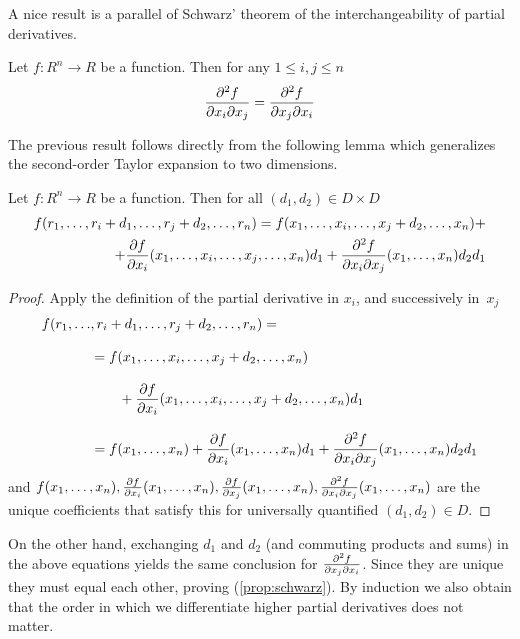 A nice result is a parallel of Schwarz' theorem of the interchangeability of partial derivatives.

\begin{proposition}
  Let \( f:R^n\to R \) be a function. Then for any \( 1\leq i,j\leq n \)
  \begin{equation*}
    \frac{\partial^{2} f}{\partial x_i \partial x_j}= \frac{\partial^{2} f}{\partial x_j \partial x_i}
  \end{equation*}
  \label{prop:schwarz}
\end{proposition}
The previous result follows directly from the following lemma which generalizes the second-order Taylor expansion to two dimensions.
\begin{lemma}
  Let \( f:R^n \to R \) be a function. Then for all \( (d_1,d_2)\in D\times D \)
  \begin{align*}
    f(r_1,\dots,r_i+d_1,\dots,r_j+d_2,\dots,r_n) = f(x_1,\dots,x_i,\dots,x_j+d_2,\dots,x_n) + \\
    \qquad + \frac{\partial f}{\partial x_i}(x_1,\dots,x_i,\dots,x_j,\dots,x_n)d_1 + \frac{\partial^{2} f}{\partial x_i \partial x_j}(x_1,\dots,x_n)d_2d_1 
  \end{align*}
\end{lemma}

\begin{proof}
  Apply the definition of the partial derivative in \( x_i \), and successively in~\( x_j \)
  \begin{align*}
    f(r_1,\dots&,r_i+d_1,\dots,r_j+d_2,\dots,r_n) =      \\[2ex]
      & = f(x_1,\dots,x_i,\dots,x_j+d_2,\dots,x_n) \\[2ex]
      & \quad\quad + \frac{\partial f}{\partial x_i}(x_1,\dots,x_i,\dots,x_j+d_2,\dots,x_n)d_1 \\[2ex]
      & = f(x_1,\dots,x_n) + \frac{\partial f}{\partial x_i}(x_1,\dots,x_n)d_1 + \frac{\partial^{2} f}{\partial x_i \partial x_j}(x_1,\dots,x_n)d_2d_1
  \end{align*}
  and \( f(x_1,\dots,x_n), \frac{\partial f}{\partial x_i}(x_1,\dots,x_n), \frac{\partial f}{\partial x_j}(x_1,\dots,x_n), \frac{\partial^{2} f}{\partial x_i \partial x_j}(x_1,\dots,x_n)  \) are the unique coefficients that satisfy this for universally quantified \( (d_1,d_2)\in D \).
\end{proof}

On the other hand, exchanging \( d_1 \) and \( d_2 \) (and commuting products and sums) in the above equations yields the same conclusion for \( \frac{\partial^{2} f}{\partial x_j \partial x_i} \). Since they are unique they must equal each other, proving (\ref{prop:schwarz}). By induction we also obtain that the order in which we differentiate higher partial derivatives does not matter.

